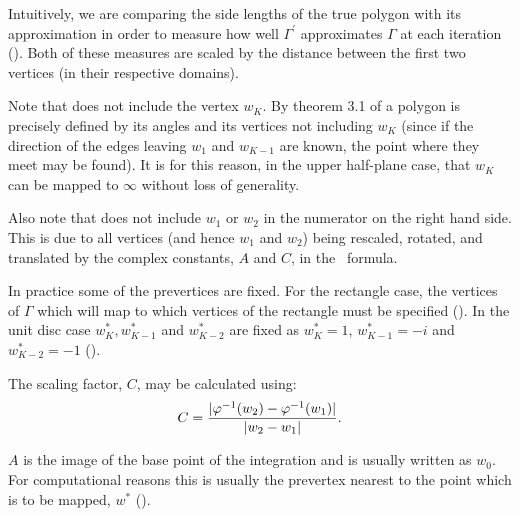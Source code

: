 Intuitively, we are comparing the side lengths of the true polygon with its approximation in order to measure how well $\Gamma^\prime$ approximates $\Gamma$ at each iteration (\cite[A-3]{snider}). Both of these measures are scaled by the distance between the first two vertices (in their respective domains).

Note that  does not include the vertex $w_K$. By theorem 3.1 of \cite[p. 24]{driscoll} a polygon is precisely defined by its angles and its vertices not including $w_K$ (since if the direction of the edges leaving $w_1$ and $w_{K-1}$ are known, the point where they meet may be found). It is for this reason, in the upper half-plane case, that $w_K$ can be mapped to $\infty$ without loss of generality.

Also note that  does not include $w_1$ or $w_2$ in the numerator on the right hand side. This is due to all vertices (and hence $w_1$ and $w_2$) being rescaled, rotated, and translated by the complex constants, $A$ and $C$, in the \sch\ formula.

\label{cor-3s18-2}In practice some of the prevertices are fixed. For the rectangle case, the vertices of $\Gamma$ which will map to which vertices of the rectangle must be specified (\cite[p. 48]{driscoll}). In the unit disc case $w^*_K, w^*_{K-1}$ and $w^*_{K-2}$ are fixed as $w^*_K=1$, $w^*_{K-1}=-i$ and $w^*_{K-2}=-1$ (\cite[p. 24]{driscoll}). 

The scaling factor, $C$, may be calculated using:
\begin{equation}
C=\frac{\vert \varphi^{-1}(w_2)-\varphi^{-1}(w_1)\vert}{\vert w_2 - w_1\vert}.
\end{equation}
\label{cor-r29-6}\label{cor-3s19}%

$A$ is the image of the base point of the integration and is usually written as $w_0$. For computational reasons this is usually the prevertex nearest to the point which is to be mapped\label{cor-3s18-1}, $w^*$ (\cite[p. 27]{driscoll}).


